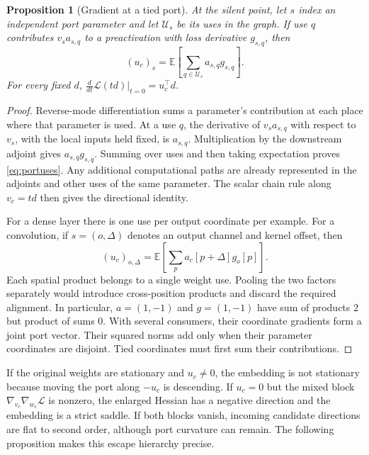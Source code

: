 \documentclass[10pt]{article}
\theoremstyle{paper}
\newtheorem{proposition}[theorem]{Proposition}
\newcommand{\E}{\mathbb E}
\newcommand{\Lcal}{\mathcal L}
\begin{document}
\begin{proposition}[Gradient at a tied port]
\label{prop:port}
At the silent point, let $s$ index an independent port parameter and let $\mathcal U_s$ be its uses in the graph. If use $q$ contributes $v_s a_{s,q}$ to a preactivation with loss derivative $g_{s,q}$, then
\begin{equation}
(u_c)_s=\E\left[\sum_{q\in\mathcal U_s}a_{s,q}g_{s,q}\right].
\label{eq:portuses}
\end{equation}
For every fixed $d$, $\frac{d}{dt}\Lcal(td)|_{t=0}=u_c^\top d$.
\end{proposition}
\begin{proof}
Reverse-mode differentiation sums a parameter's contribution at each place where that parameter is used. At a use $q$, the derivative of $v_sa_{s,q}$ with respect to $v_s$, with the local inputs held fixed, is $a_{s,q}$. Multiplication by the downstream adjoint gives $a_{s,q}g_{s,q}$. Summing over uses and then taking expectation proves \cref{eq:portuses}. Any additional computational paths are already represented in the adjoints and other uses of the same parameter. The scalar chain rule along $v_c=td$ then gives the directional identity.

For a dense layer there is one use per output coordinate per example. For a convolution, if $s=(o,\Delta)$ denotes an output channel and kernel offset, then
\[
(u_c)_{o,\Delta}=\E\left[\sum_p a_c[p+\Delta]g_o[p]\right].
\]
Each spatial product belongs to a single weight use. Pooling the two factors separately would introduce cross-position products and discard the required alignment. In particular, $a=(1,-1)$ and $g=(1,-1)$ have sum of products $2$ but product of sums $0$. With several consumers, their coordinate gradients form a joint port vector. Their squared norms add only when their parameter coordinates are disjoint. Tied coordinates must first sum their contributions.
\end{proof}

If the original weights are stationary and $u_c\ne0$, the embedding is not stationary because moving the port along $-u_c$ is descending. If $u_c=0$ but the mixed block $\nabla_{v_c}\nabla_{w_c}\Lcal$ is nonzero, the enlarged Hessian has a negative direction and the embedding is a strict saddle. If both blocks vanish, incoming candidate directions are flat to second order, although port curvature can remain. The following proposition makes this escape hierarchy precise.
\end{document}
